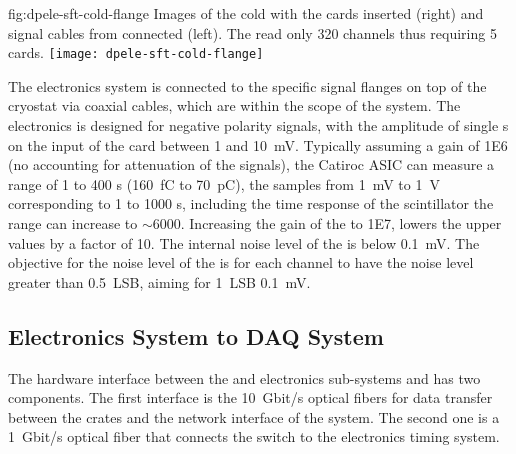 \begin{dunefigure}{fig:dpele-sft-cold-flange}
{Images of the   cold \fdth with the  cards inserted (right) and signal cables from  connected (left). The   read only \num{320} channels thus requiring \num{5}  cards.}
\texttt{[image: dpele-sft-cold-flange]}
\end{dunefigure}

The  electronics system is connected to the specific  signal \fdth flanges on top of the cryostat via coaxial cables, which are within the scope of the  system.
The  electronics is designed for negative polarity  signals, with the amplitude of single \phel{}s on the input of the card between \num{1} and \SI{10}{\milli\volt}. Typically assuming a  gain of \num{1E6} (no accounting for attenuation of the signals), the Catiroc ASIC can measure a range of \num{1} to \num{400} \phel{}s (\SI{160}{\femto\coulomb} to \SI{70}{\pico\coulomb}), the  samples from \SI{1}{\milli\volt} to \SI{1}{\volt} corresponding to \num{1} to \num{1000} \phel{}s, including the time response of the scintillator the range can increase to $\sim$\num{6000}. Increasing the gain of the  to \num{1E7}, lowers the upper values by a factor of 10. The internal noise level of the  is below \SI{0.1}{\milli\volt}. The objective for the noise level of the  is for each channel to have the \rms noise level greater than \SI{0.5}{LSB}, aiming for \SI{1}{LSB} \SI{0.1}{\milli\volt}.

\subsection{Electronics System to DAQ System}
\label{sec:fddp-tpc-elec-intfc-daq}

The hardware interface between the \dual {} and  electronics sub-systems and  has two components. 
The first interface is the \SI{10}{Gbit/s} optical fibers for data transfer between the  crates and the network interface of the  system. The second one is a \SI{1}{Gbit/s} optical fiber that connects the   switch to the \dual electronics timing system.   

